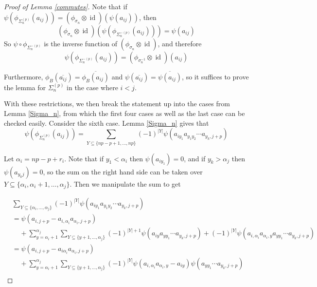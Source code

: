\documentclass[11pt]{amsart}
\def\s{{\sigma}}
\def\a{\alpha}
\newcommand\id{\operatorname{id}}
\newcommand\Sp{\Sigma^{(p)}}
\newcommand\SpM{\Sigma^{-(p)}}
\begin{document}
\begin{proof} [Proof of Lemma \ref{commutes}]
Note that if $\psi(\phi_{\Sp_n}(a_{ij})) = (\phi_{\s_n} \otimes \id)(\psi(a_{ij}))$, then
$$\left(\phi_{\s_n}\otimes\id\right)\left(\psi\left(\phi_{\SpM_n}\left(a_{ij}\right)\right)\right) = \psi(a_{ij})$$
So $\psi\circ\phi_{\SpM_n}$ is the inverse function of $\left(\phi_{\s_n}\otimes\id\right)$, and therefore
$$\psi\left(\phi_{\SpM_n}\left(a_{ij}\right)\right) = \left(\phi_{\s_n^{-1}}\otimes\id\right)(a_{ij})$$

Furthermore, $\phi_B(\overline{a_{ij}}) = \overline{\phi_B(a_{ij})}$ and $\psi(\overline{a_{ij}}) = \overline{\psi(a_{ij})}$, so it suffices to prove the lemma for $\Sp_n$ in the case where $i<j$.

With these restrictions, we then break the statement up into the cases from Lemma \ref{Sigma_n}, from which the first four cases as well as the last case can be checked easily.  Consider the sixth case.  Lemma \ref{Sigma_n} gives that
$$\psi\left(\phi_{\Sp_n}(a_{ij})\right) = \sum_{Y\subseteq \{np-p+1,\ldots,np\}}(-1)^{|Y|}\psi\left(a_{iy_1}a_{y_1y_2}\cdots a_{y_k,j+p}\right)$$


Let $\a_i  = np-p+r_i$.  Note that if $y_1<\a_i$ then $\psi(a_{iy_1}) = 0$, and if $y_k>\a_j$ then $\psi(a_{y_kj}) = 0$, so the sum on the right hand side can be taken over $Y\subseteq\{\a_i,\a_i+1,\ldots,\a_j\}$.  Then we manipulate the sum to get

\begin{align*}
& \sum_{Y\subseteq \{\a_i,\ldots,\a_j\}}(-1)^{|Y|}\psi\left(a_{iy_1}a_{y_1y_2}\cdots a_{y_k,j+p}\right)\\
&= \psi\left(a_{i,j+p} - a_{i,\a_i}a_{\a_i,j+p}\right)\\
& \;\;\;\;+ \sum_{y=\a_i+1}^{\a_j}\sum_{Y\subseteq \{y+1,\ldots,\a_j\}}(-1)^{|Y|+1}\psi\left(a_{iy}a_{yy_1}\cdots a_{y_k,j+p}\right) + (-1)^{|Y|}\psi\left(a_{i,\a_i}a_{\a_i,y}a_{yy_1}\cdots a_{y_k,j+p}\right)\\
&= \psi\left(a_{i,j+p} - a_{i\a_i}a_{\a_i,j+p}\right)\\
& \;\;\;\;+ \sum_{y=\a_i+1}^{\a_j}\sum_{Y\subseteq \{y+1,\ldots,\a_j\}}(-1)^{|Y|}\psi\left(a_{i,\a_i}a_{\a_i,y} - a_{iy}\right)\psi\left(a_{yy_1}\cdots a_{y_k,j+p}\right)\\
\end{align*}




\end{proof}
\end{document}
